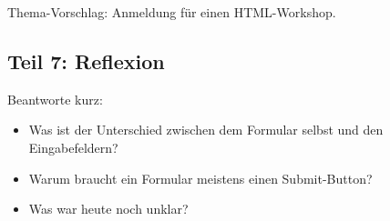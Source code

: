 \documentclass[a4paper,12pt]{article}
\begin{document}
Thema-Vorschlag: Anmeldung für einen HTML-Workshop.

\subsection*{Teil 7: Reflexion}
Beantworte kurz:
\begin{itemize}
  \item Was ist der Unterschied zwischen dem Formular selbst und den Eingabefeldern?
  \item Warum braucht ein Formular meistens einen Submit-Button?
  \item Was war heute noch unklar?
\end{itemize}
\end{document}
